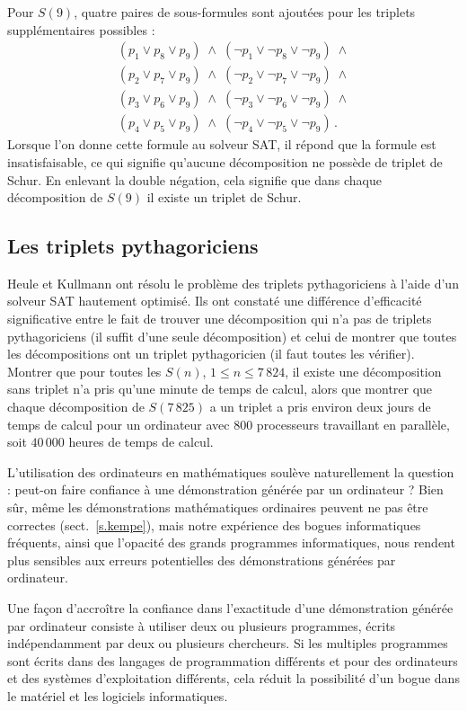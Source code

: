 Pour $S(9)$, quatre paires de sous-formules sont ajoutées pour les triplets supplémentaires possibles :
\[
\begin{array}{l}
(p_1 \vee p_8 \vee p_9) \;\wedge\; (\neg p_1 \vee \neg p_8 \vee \neg p_9) \;\wedge \\
(p_2 \vee p_7 \vee p_9) \;\wedge\; (\neg p_2 \vee \neg p_7 \vee \neg p_9) \;\wedge \\
(p_3 \vee p_6 \vee p_9) \;\wedge\; (\neg p_3 \vee \neg p_6 \vee \neg p_9) \;\wedge \\
(p_4 \vee p_5 \vee p_9) \;\wedge\; (\neg p_4 \vee \neg p_5 \vee \neg p_9)\,.
\end{array}
\]
Lorsque l'on donne cette formule au solveur SAT, il répond que la formule est insatisfaisable, ce qui signifie qu'aucune décomposition ne possède de triplet de Schur. En enlevant la double négation, cela signifie que dans chaque décomposition de $S(9)$ il existe un triplet de Schur.

\subsection{Les triplets pythagoriciens}

Heule et Kullmann ont résolu le problème des triplets pythagoriciens à l'aide d'un solveur SAT hautement optimisé. Ils ont constaté une différence d'efficacité significative entre le fait de trouver une décomposition qui n'a pas de triplets pythagoriciens (il suffit d'une seule décomposition) et celui de montrer que toutes les décompositions ont un triplet pythagoricien (il faut toutes les vérifier). Montrer que pour toutes les $S(n)$, $1\leq n\leq 7\,824$, il existe une décomposition sans triplet n'a pris qu'une minute de temps de calcul, alors que montrer que chaque décomposition de $S(7\,825)$ a un triplet a pris environ deux jours de temps de calcul pour un ordinateur avec $800$ 
 processeurs travaillant en parallèle, soit $40\,000$ heures de temps de calcul.

L'utilisation des ordinateurs en mathématiques soulève naturellement la question : peut-on faire confiance à une démonstration générée par un ordinateur ? Bien sûr, même les démonstrations mathématiques \og ordinaires\fg{} peuvent ne pas être correctes (sect.~\ref{s.kempe}), mais notre expérience des bogues informatiques fréquents, ainsi que l'opacité des grands programmes informatiques, nous rendent plus sensibles aux erreurs potentielles des démonstrations générées par ordinateur.

Une façon d'accroître la confiance dans l'exactitude d'une démonstration générée par ordinateur consiste à utiliser deux ou plusieurs programmes, écrits indépendamment par deux ou plusieurs chercheurs. Si les multiples programmes sont écrits dans des langages de programmation différents et pour des ordinateurs et des systèmes d'exploitation différents, cela réduit la possibilité d'un bogue dans le matériel et les logiciels informatiques.

